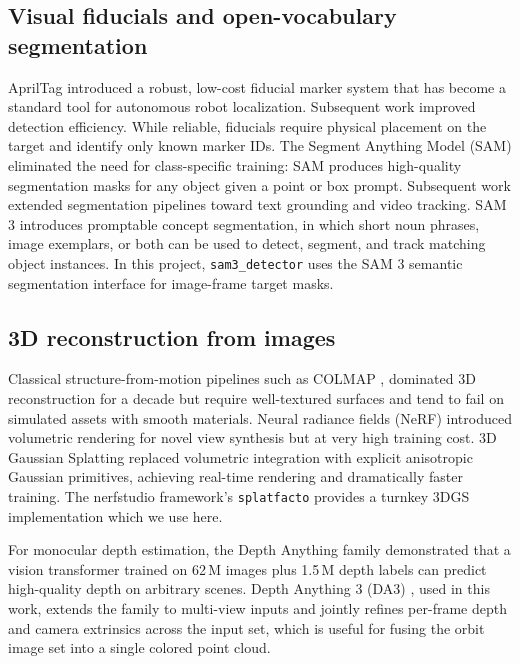 \documentclass[conference]{IEEEtran}
\begin{document}
\subsection{Visual fiducials and open-vocabulary segmentation}

AprilTag \cite{olson2011apriltag} introduced a robust, low-cost
fiducial marker system that has become a standard tool for autonomous
robot localization. Subsequent work \cite{wang2016apriltag2} improved
detection efficiency. While reliable, fiducials require physical
placement on the target and identify only known marker IDs. The
Segment Anything Model (SAM) \cite{kirillov2023sam} eliminated the
need for class-specific training: SAM produces high-quality
segmentation masks for any object given a point or box prompt. Subsequent
work extended segmentation pipelines toward text grounding and video
tracking. SAM 3 \cite{carion2025sam3} introduces promptable concept
segmentation, in which short noun phrases, image exemplars, or both
can be used to detect, segment, and track matching object instances.
In this project, \texttt{sam3\_detector} uses the SAM 3 semantic
segmentation interface for image-frame target masks.

\subsection{3D reconstruction from images}

Classical structure-from-motion pipelines such as COLMAP
\cite{schonberger2016sfm}, \cite{schonberger2016mvs} dominated 3D
reconstruction for a decade but require well-textured surfaces and
tend to fail on simulated assets with smooth materials.
Neural radiance fields (NeRF) \cite{mildenhall2020nerf} introduced
volumetric rendering for novel view synthesis but at very high
training cost. 3D Gaussian Splatting \cite{kerbl2023_3dgs} replaced
volumetric integration with explicit anisotropic Gaussian primitives,
achieving real-time rendering and dramatically faster training. The
nerfstudio framework's \texttt{splatfacto}
\cite{tancik2023nerfstudio} provides a turnkey 3DGS implementation
which we use here.

For monocular depth estimation, the Depth Anything family
\cite{yang2024depthanything} demonstrated that a vision transformer
trained on 62\,M images plus 1.5\,M depth labels can predict
high-quality depth on arbitrary scenes. Depth Anything 3 (DA3)
\cite{lin2025da3}, used in this work, extends the family to
multi-view inputs and jointly refines per-frame depth and camera
extrinsics across the input set, which is useful for fusing the orbit
image set into a single colored point cloud.
\end{document}
